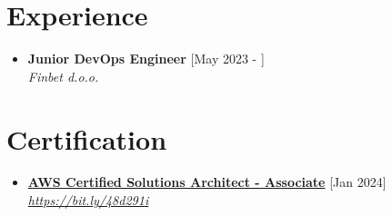 \documentclass[a4paper]{moderncv}
\begin{document}
\makecvtitle



\section{Experience}

\begin{itemize}	
	\item \textbf{Junior DevOps Engineer} \hfill [May 2023 - ]\\
	\textit{Finbet d.o.o.}
\end{itemize}	

\section{Certification}

\begin{itemize}
	\item \textbf{\href{https://aws.amazon.com/certification/certified-solutions-architect-associate/}{AWS Certified Solutions Architect - Associate}} \hfill [Jan 2024]\\
	\textit{\href{https://cp.certmetrics.com/amazon/en/public/verify/credential/c546a05a82c243b895493ff0316a1e67}{https://bit.ly/48d291i}}				
	
	


	
\end{itemize}
\end{document}
